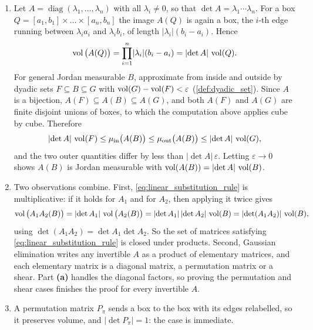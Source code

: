 \begin{exercisesolution}
\label{sol:linear_substitution_elementary_matrices}
\begin{enumerate}[label=\textbf{(\alph*)}]
  \item Let $A = \operatorname{diag}(\lambda_1,\dots,\lambda_n)$ with all $\lambda_i \neq 0$, so
    that $\det A = \lambda_1\cdots\lambda_n$. For a box
    $Q = [a_1,b_1]\times\dots\times[a_n,b_n]$ the image $A(Q)$ is again a box, the $i$-th edge
    running between $\lambda_ia_i$ and $\lambda_ib_i$, of length
    $\lvert\lambda_i\rvert(b_i-a_i)$. Hence
    \[\operatorname{vol}\big(A(Q)\big) = \prod_{i=1}^n \lvert\lambda_i\rvert(b_i-a_i)
      = \lvert\det A\rvert\,\operatorname{vol}(Q).\]
    For general Jordan measurable $B$, approximate from inside and outside by dyadic sets
    $F \subseteq B \subseteq G$ with $\operatorname{vol}(G)-\operatorname{vol}(F) < \varepsilon$
    (\cref{def:dyadic_set}). Since $A$ is a bijection, $A(F) \subseteq A(B) \subseteq A(G)$, and
    both $A(F)$ and $A(G)$ are finite disjoint unions of boxes, to which the computation above
    applies cube by cube. Therefore
    \[\lvert\det A\rvert\,\operatorname{vol}(F) \le \mu_{\mathrm{in}}\big(A(B)\big)
      \le \mu_{\mathrm{out}}\big(A(B)\big) \le \lvert\det A\rvert\,\operatorname{vol}(G),\]
    and the two outer quantities differ by less than $\lvert\det A\rvert\,\varepsilon$. Letting
    $\varepsilon \to 0$ shows $A(B)$ is Jordan measurable with
    $\operatorname{vol}(A(B)) = \lvert\det A\rvert\,\operatorname{vol}(B)$.

  \item Two observations combine. First, \eqref{eq:linear_substitution_rule} is multiplicative: if
    it holds for $A_1$ and for $A_2$, then applying it twice gives
    \[\operatorname{vol}\big(A_1A_2(B)\big) = \lvert\det A_1\rvert\,\operatorname{vol}\big(A_2(B)\big)
      = \lvert\det A_1\rvert\,\lvert\det A_2\rvert\,\operatorname{vol}(B)
      = \lvert\det(A_1A_2)\rvert\,\operatorname{vol}(B),\]
    using $\det(A_1A_2) = \det A_1 \det A_2$. So the set of matrices satisfying
    \eqref{eq:linear_substitution_rule} is closed under products. Second, Gaussian elimination
    writes any invertible $A$ as a product of elementary matrices, and each elementary matrix is a
    diagonal matrix, a permutation matrix or a shear. Part \textbf{(a)} handles the diagonal
    factors, so proving the permutation and shear cases finishes the proof for every invertible
    $A$.

  \item A permutation matrix $P_\pi$ sends a box to the box with its edges relabelled, so it
    preserves volume, and $\lvert\det P_\pi\rvert = 1$: the case is immediate.


\end{enumerate}
\end{exercisesolution}
